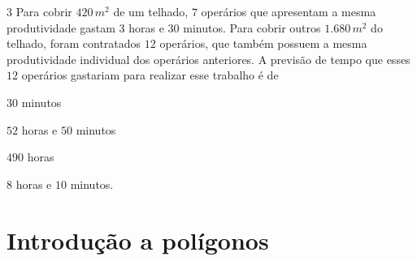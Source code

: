 

\num{3}  Para cobrir $420\,m^2$ de um telhado, $7$ operários que apresentam a mesma
produtividade gastam $3$ horas e $30$ minutos. Para cobrir outros $1.680\,m^2$
do telhado, foram contratados $12$ operários, que também possuem a mesma
produtividade individual dos operários anteriores. A previsão de tempo
que esses $12$ operários gastariam para realizar esse trabalho é de

\begin{escolha}
\item $30$ minutos
\item $52$ horas e $50$ minutos
\item $490$ horas
\item $8$ horas e $10$ minutos.
\end{escolha}



\chapter{Introdução a polígonos}

